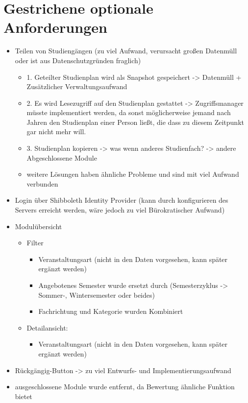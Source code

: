 \section{Gestrichene optionale Anforderungen}
\begin{itemize}
	\item Teilen von Studiengängen (zu viel Aufwand, verursacht großen Datenmüll oder ist aus Datenschutzgründen fraglich)
		\begin{itemize}
			\item 1. Geteilter Studienplan wird als Snapshot gespeichert -> Datenmüll + Zusätzlicher Verwaltungsaufwand
			\item 2. Es wird Lesezugriff auf den Studienplan gestattet -> Zugriffsmanager müsste implementiert werden, da sonst möglicherweise jemand nach Jahren den Studienplan einer Person ließt, die dass zu diesem Zeitpunkt gar nicht mehr will.
			\item 3. Studienplan kopieren -> was wenn anderes Studienfach? -> andere Abgeschlossene Module
			\item weitere Lösungen haben ähnliche Probleme und sind mit viel Aufwand verbunden
		\end{itemize}	
	\item Login über Shibboleth Identity Provider (kann durch konfigurieren des Servers erreicht werden, wäre jedoch zu viel Bürokratischer Aufwand)
	\item Modulübersicht
		\begin{itemize}
			\item Filter
				\begin{itemize}
					\item Veranstaltungsart (nicht in den Daten vorgesehen, kann später ergänzt werden)
					\item Angebotenes Semester wurde ersetzt durch (Semesterzyklus -> Sommer-, Wintersemester oder beides)
					\item Fachrichtung und Kategorie wurden Kombiniert
				\end{itemize}
			\item Detailansicht:
				\begin{itemize}
					\item Veranstaltungsart (nicht in den Daten vorgesehen, kann später ergänzt werden)
				\end{itemize}
		\end{itemize}
	\item Rückgängig-Button -> zu viel Entwurfs- und Implementierungsaufwand
	\item ausgeschlossene Module wurde entfernt, da Bewertung ähnliche Funktion bietet	
\end{itemize}